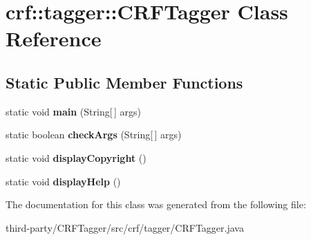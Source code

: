 \hypertarget{classcrf_1_1tagger_1_1CRFTagger}{
\section{crf::tagger::CRFTagger Class Reference}
\label{classcrf_1_1tagger_1_1CRFTagger}
}
\subsection*{Static Public Member Functions}
\begin{DoxyCompactItemize}
\item 
\hypertarget{classcrf_1_1tagger_1_1CRFTagger_a1ecff1593014efcb8a1c76e5e472b07b}{
static void {\bfseries main} (String\mbox{[}$\,$\mbox{]} args)}
\label{classcrf_1_1tagger_1_1CRFTagger_a1ecff1593014efcb8a1c76e5e472b07b}

\item 
\hypertarget{classcrf_1_1tagger_1_1CRFTagger_aa134c7bf2c40906d86a3fb81618661ae}{
static boolean {\bfseries checkArgs} (String\mbox{[}$\,$\mbox{]} args)}
\label{classcrf_1_1tagger_1_1CRFTagger_aa134c7bf2c40906d86a3fb81618661ae}

\item 
\hypertarget{classcrf_1_1tagger_1_1CRFTagger_a111b933bb16e307c9a2e2122a65c6145}{
static void {\bfseries displayCopyright} ()}
\label{classcrf_1_1tagger_1_1CRFTagger_a111b933bb16e307c9a2e2122a65c6145}

\item 
\hypertarget{classcrf_1_1tagger_1_1CRFTagger_a2281cc9210a5ca73cdf082de604f69ba}{
static void {\bfseries displayHelp} ()}
\label{classcrf_1_1tagger_1_1CRFTagger_a2281cc9210a5ca73cdf082de604f69ba}

\end{DoxyCompactItemize}


The documentation for this class was generated from the following file:\begin{DoxyCompactItemize}
\item 
third-\/party/CRFTagger/src/crf/tagger/CRFTagger.java\end{DoxyCompactItemize}
